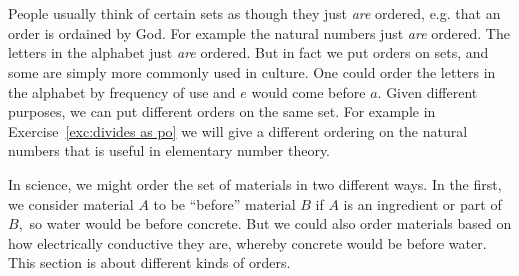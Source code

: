 \documentclass[../main/CT4S-EN-RU]{subfiles}
\begin{document}
\section{}\label{sec:orders}

\begin{blockENG}
People usually think of certain sets as though they just {\em are} ordered, e.g. that an order is ordained by God. For example the natural numbers just {\em are} ordered. The letters in the alphabet just {\em are} ordered. But in fact we put orders on sets, and some are simply more commonly used in culture. One could order the letters in the alphabet by frequency of use and $e$ would come before $a.$ Given different purposes, we can put different orders on the same set. For example in Exercise~\ref{exc:divides as po} we will give a different ordering on the natural numbers that is useful in elementary number theory.
\end{blockENG}

\begin{blockRUS}
\end{blockRUS}

\begin{blockENG}
In science, we might order the set of materials in two different ways. In the first, we consider material $A$ to be “before” material $B$ if $A$ is an ingredient or part of $B,$ so water would be before concrete. But we could also order materials based on how electrically conductive they are, whereby concrete would be before water. This section is about different kinds of orders.
\end{blockENG}


\subsection{}
\end{document}
